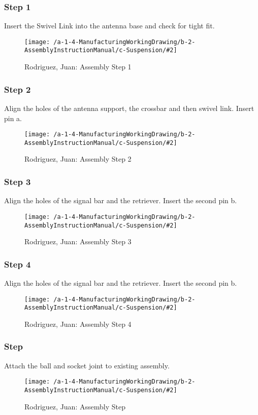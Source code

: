 \newcommand{\AssemblyManualAntenna}[3]{
\subsubsection{Step #1}
\begin{center}
#3
\begin{figure}[!ht]
\texttt{[image: /a-1-4-ManufacturingWorkingDrawing/b-2-AssemblyInstructionManual/c-Suspension/\#2]}
\caption{Rodriguez, Juan: Assembly Step #1}
\end{figure}
\end{center}
}

\AssemblyManualAntenna{1}{step1.jpeg}{
Insert the Swivel Link into the antenna base and check for tight fit.
}
\AssemblyManualAntenna{2}{step2.jpeg}{
Align the holes of the antenna support, the crossbar and then swivel link. Insert pin a.
}
\AssemblyManualAntenna{3}{step3.jpeg}{
Align the holes of the signal bar and the retriever. Insert the second pin b.
}
\AssemblyManualAntenna{4}{step4.jpeg}{
Align the holes of the signal bar and the retriever. Insert the second pin b.
}
\AssemblyManualAntenna{}{step5.jpeg}{
Attach the ball and socket joint to existing assembly.
}
